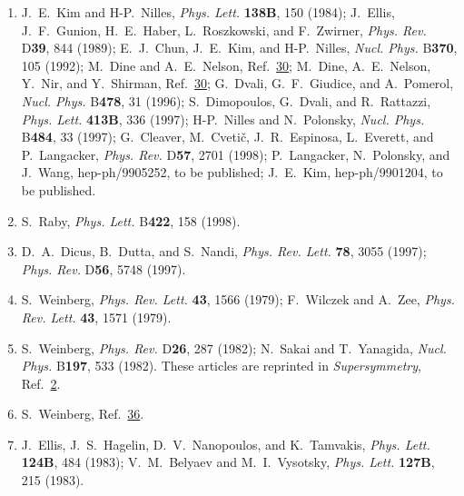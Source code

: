 \begin{enumerate}
  \item {}\label{ch28-ref-35}
  J.~E.~Kim and H-P.~Nilles, \textit{Phys. Lett.} \textbf{138B}, 150
  (1984); J.~Ellis, J.~F.~Gunion, H.~E.~Haber, L.~Roszkowski, and
  F.~Zwirner, \textit{Phys. Rev.} D\textbf{39}, 844 (1989); E.~J.~Chun,
  J.~E.~Kim, and H-P.~Nilles, \textit{Nucl. Phys.} B\textbf{370}, 105
  (1992); M.~Dine and A.~E.~Nelson,
  Ref.~\hyperref[ch28-ref-30]{30}; M.~Dine, A.~E.~Nelson, Y.~Nir, and
  Y.~Shirman, Ref.~\hyperref[ch28-ref-30]{30}; G.~Dvali, G.~F.~Giudice,
  and A.~Pomerol, \textit{Nucl. Phys.} B\textbf{478}, 31 (1996);
  S.~Dimopoulos, G.~Dvali, and R.~Rattazzi, \textit{Phys. Lett.}
  \textbf{413B}, 336 (1997); H-P.~Nilles and N.~Polonsky,
  \textit{Nucl. Phys.} B\textbf{484}, 33 (1997); G.~Cleaver,
  M.~Cveti\v{c}, J.~R.~Espinosa, L.~Everett, and P.~Langacker,
  \textit{Phys. Rev.} D\textbf{57}, 2701 (1998); P.~Langacker,
  N.~Polonsky, and J.~Wang, hep-ph/9905252, to be published; J.~E.~Kim,
  hep-ph/9901204, to be published.

  \item[35a.] \label{ch28-ref-35a}
  S.~Raby, \textit{Phys. Lett.} B\textbf{422}, 158 (1998).

  \item[35b.] \label{ch28-ref-35b}
  D.~A.~Dicus, B.~Dutta, and S.~Nandi, \textit{Phys. Rev. Lett.}
  \textbf{78}, 3055 (1997); \textit{Phys. Rev.} D\textbf{56}, 5748
  (1997).

  \item {}\label{ch28-ref-36}
  S.~Weinberg, \textit{Phys. Rev. Lett.} \textbf{43}, 1566 (1979);
  F.~Wilczek and A.~Zee, \textit{Phys. Rev. Lett.} \textbf{43}, 1571
  (1979).

  \item {}\label{ch28-ref-37}
  S.~Weinberg, \textit{Phys. Rev.} D\textbf{26}, 287 (1982); N.~Sakai
  and T.~Yanagida, \textit{Nucl. Phys.} B\textbf{197}, 533 (1982).
  These articles are reprinted in \textit{Supersymmetry},
  Ref.~\hyperref[ch28-ref-2]{2}.

  \item {}\label{ch28-ref-38}
  S.~Weinberg, Ref.~\hyperref[ch28-ref-36]{36}.

  \item {}\label{ch28-ref-39}
  J.~Ellis, J.~S.~Hagelin, D.~V.~Nanopoulos, and K.~Tamvakis,
  \textit{Phys. Lett.} \textbf{124B}, 484 (1983); V.~M.~Belyaev and
  M.~I.~Vysotsky, \textit{Phys. Lett.} \textbf{127B}, 215 (1983).


\end{enumerate}
